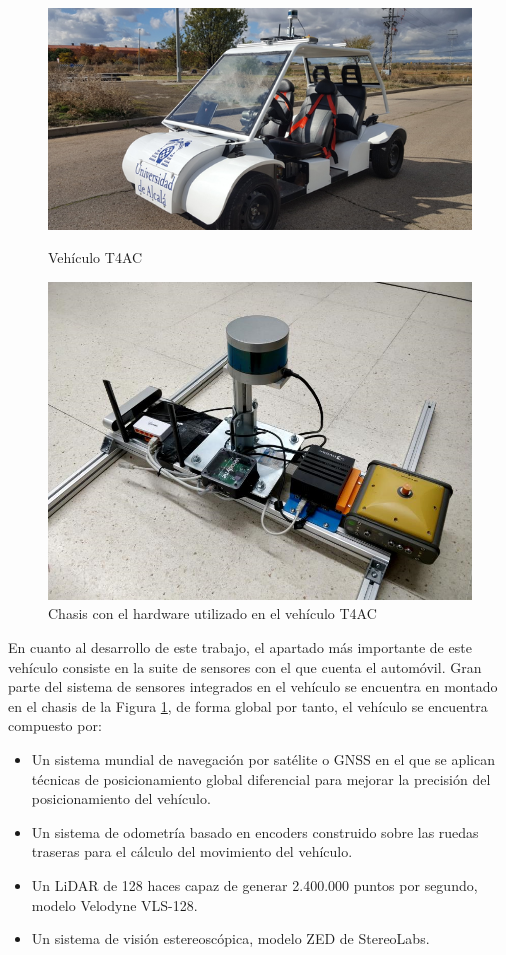 \begin{figure}[H]
	\begin{minipage}{0.48\textwidth}
		\centering
		\includegraphics[width=1\linewidth]{Book/figures/4_kitti/vehiculo_t4ac.png}
		\caption{Vehículo T4AC}
		\label{fig:Vehículo T4AC}
	\end{minipage}\hfill
	\begin{minipage}{0.48\textwidth}
		\centering
		\includegraphics[width=0.7\linewidth]{Book/figures/4_kitti/chasis_hardware.png}
		\caption{Chasis con el hardware utilizado en el vehículo T4AC}
		\label{fig:Chasis con el hardware utilizado en el vehículo T4AC}
	\end{minipage}
\end{figure}

En cuanto al desarrollo de este trabajo, el apartado más importante de este vehículo consiste en la suite de sensores con el que cuenta el automóvil. Gran parte del sistema de sensores integrados en el vehículo se encuentra en montado en el chasis de la Figura \ref{fig:Chasis con el hardware utilizado en el vehículo T4AC}, de forma global por tanto, el vehículo se encuentra compuesto por:

\begin{itemize}
    \item Un sistema mundial de navegación por satélite o \acs{GNSS} en el que se aplican técnicas de posicionamiento global diferencial para mejorar la precisión del posicionamiento del vehículo.
    \item Un sistema de odometría basado en encoders construido sobre las ruedas traseras para el cálculo del movimiento del vehículo.
    \item Un \ac{LiDAR} de 128 haces capaz de generar 2.400.000 puntos por segundo, modelo Velodyne VLS-128.
    \item Un sistema de visión estereoscópica, modelo ZED de StereoLabs.
\end{itemize}

